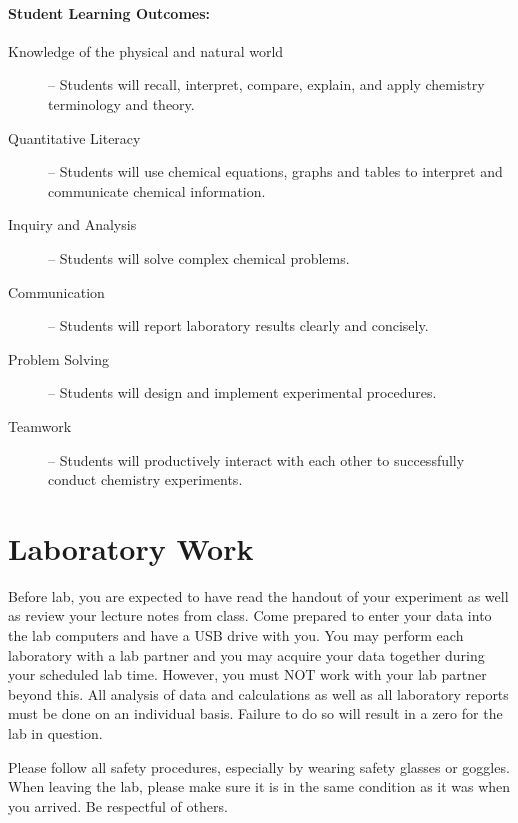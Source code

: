 \documentclass[12pt, letterpaper]{article}
\begin{document}
\paragraph{Student Learning Outcomes:}
\begin{description}
	\item[Knowledge of the physical and natural world] -- Students will recall, interpret, compare, explain, and apply chemistry terminology and theory.
	\item[Quantitative Literacy] -- Students will use chemical equations, graphs and tables to interpret and communicate chemical information.
	\item[Inquiry and Analysis] -- Students will solve complex chemical problems.
	\item[Communication] -- Students will report laboratory results clearly and concisely.
	\item[Problem Solving] -- Students will design and implement experimental procedures.
	\item[Teamwork] -- Students will productively interact with each other to successfully conduct chemistry experiments.
\end{description}

\section*{Laboratory Work}
Before lab, you are expected to have read the handout of your experiment as well as review your lecture notes from class. Come prepared to enter your data into the lab computers and have a USB drive with you. You may perform each laboratory with a lab partner and you may acquire your data together during your scheduled lab time. However, you must NOT work with your lab partner beyond this. All analysis of data and calculations as well as all laboratory reports must be done on an individual basis. Failure to do so will result in a zero for the lab in question.

\noindent Please follow all safety procedures, especially by wearing safety glasses or goggles. When leaving the lab, please make sure it is in the same condition as it was when you arrived. Be respectful of others.
\end{document}
